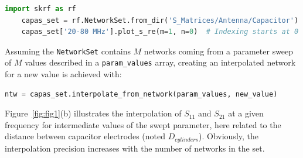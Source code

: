 \documentclass{aip-cp}
\begin{document}
	\begin{lstlisting}[language=Python]
	import skrf as rf
	capas_set = rf.NetworkSet.from_dir('S_Matrices/Antenna/Capacitor')
	capas_set['20-80 MHz'].plot_s_re(m=1, n=0)  # Indexing starts at 0 in Python
	\end{lstlisting}
	
	Assuming the \texttt{NetworkSet} contains $M$ networks coming from a parameter sweep of $M$ values described in a \texttt{param\_values} array, creating an interpolated network for a new value is achieved with:
	
	\begin{lstlisting}[language=Python]
	ntw = capas_set.interpolate_from_network(param_values, new_value)
	\end{lstlisting}
	
	Figure~\ref{fig:fig1}(b) illustrates the interpolation of $S_{11}$ and $S_{21}$ at a given frequency for intermediate values of the swept parameter, here related to the distance between capacitor electrodes (noted $D_{cylinders}$). Obviously, the interpolation precision increases with the number of networks in the set.
	
\end{document}
